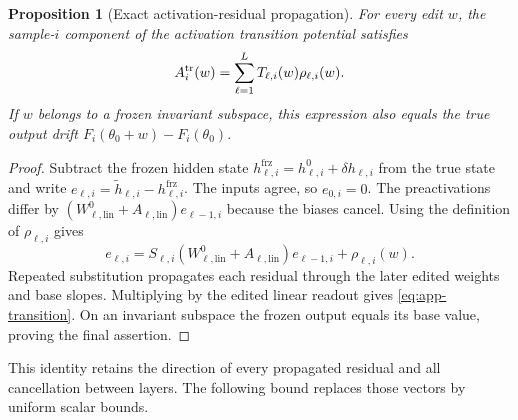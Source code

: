 \documentclass[twoside]{article}
\newtheorem{proposition}[theorem]{Proposition}
\theoremstyle{remark}
\newcommand{\frz}{\mathrm{frz}}
\theoremstyle{highlightdefinition}
\theoremstyle{remark}
\begin{document}
\begin{proposition}[Exact activation-residual propagation]\label{prop:app-exact-transition}
For every edit $w$, the sample-$i$ component of the activation transition potential satisfies
\begin{equation}
 A_i^{\rm tr}(w)=\sum_{\ell=1}^L T_{\ell,i}(w)\rho_{\ell,i}(w).
 \label{eq:app-transition}
\end{equation}
If $w$ belongs to a frozen invariant subspace, this expression also equals the true output drift $F_i(\theta_0+w)-F_i(\theta_0)$.
\end{proposition}
\begin{proof}
Subtract the frozen hidden state $h_{\ell,i}^{\frz}=h_{\ell,i}^0+\delta h_{\ell,i}$ from the true state and write $e_{\ell,i}=\widetilde h_{\ell,i}-h_{\ell,i}^{\frz}$. The inputs agree, so $e_{0,i}=0$. The preactivations differ by $(W_{\ell,\mathrm{lin}}^0+A_{\ell,\mathrm{lin}})e_{\ell-1,i}$ because the biases cancel. Using the definition of $\rho_{\ell,i}$ gives
\[
 e_{\ell,i}=S_{\ell,i}(W_{\ell,\mathrm{lin}}^0+A_{\ell,\mathrm{lin}})e_{\ell-1,i}+\rho_{\ell,i}(w).
\]
Repeated substitution propagates each residual through the later edited weights and base slopes. Multiplying by the edited linear readout gives \eqref{eq:app-transition}. On an invariant subspace the frozen output equals its base value, proving the final assertion.
\end{proof}
This identity retains the direction of every propagated residual and all cancellation between layers. The following bound replaces those vectors by uniform scalar bounds.
\end{document}
